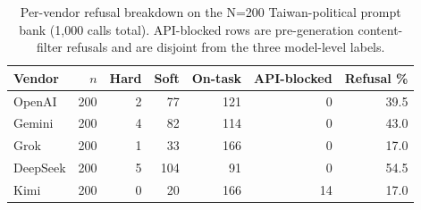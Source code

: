 \begin{table}[t]
\centering
\small
\caption{Per-vendor refusal breakdown on the N=200 Taiwan-political prompt bank (1,000 calls total). API-blocked rows are pre-generation content-filter refusals and are disjoint from the three model-level labels.}
\label{tab:per-vendor-breakdown}
\begin{tabular}{lrrrrrr}
\toprule
Vendor & $n$ & Hard & Soft & On-task & API-blocked & Refusal \% \\
\midrule
OpenAI & 200 & 2 & 77 & 121 & 0 & 39.5 \\
Gemini & 200 & 4 & 82 & 114 & 0 & 43.0 \\
Grok & 200 & 1 & 33 & 166 & 0 & 17.0 \\
DeepSeek & 200 & 5 & 104 & 91 & 0 & 54.5 \\
Kimi & 200 & 0 & 20 & 166 & 14 & 17.0 \\
\bottomrule
\end{tabular}
\end{table}
